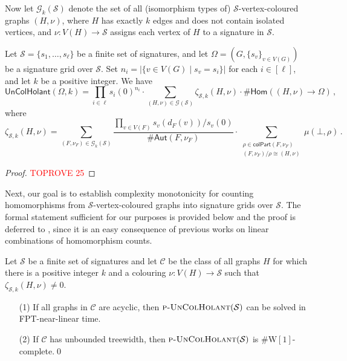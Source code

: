 \documentclass[authorcolumns,numberwithinsect]{no-lipics-v2022}
\newcommand{\homs}[2]{\mathsf{Hom}(#1 \to #2)}
\newcommand{\W}{\mathrm{W}}
\begin{document}
Now let $\mathcal{G}_k(\mathcal{S})$ denote the set of all (isomorphism types of) $\mathcal{S}$-vertex-coloured graphs $(H,\nu)$, where $H$ has exactly $k$ edges and does not contain isolated vertices, and $\nu:V(H)\to \mathcal{S}$ assigns each vertex of $H$ to a signature in $\mathcal{S}$.
\begin{lemma}\label{lem:uncoloured_hombasis_general}
    Let $\mathcal{S}=\{s_1,\dots,s_\ell\}$ be a finite set of signatures, and let
    $\Omega=(G,\{s_v\}_{v\in V(G)})$ be a signature grid over $\mathcal{S}$. Set $n_i=|\{v\in V(G)\mid s_v=s_i\}|$ for each $i\in [\ell]$, and let $k$ be a positive integer. We have
    \[ \mathsf{UnColHolant}(\Omega,k) = \prod_{i\in \ell}s_i(0)^{n_i} \cdot \sum_{(H,\nu)\in \mathcal{G}(\mathcal{S})} \zeta_{\mathcal{S},k}(H,\nu) \cdot \#\homs{(H,\nu)}{\Omega}\,, \]
    where 
    \[\zeta_{\mathcal{S},k}(H,\nu)= \sum_{(F,\nu_F)\in\mathcal{G}_k(\mathcal{S})} \frac{\prod_{v\in V(F)}{s_v(d_F(v))}/{s_v(0)}}{\#\mathsf{Aut}(F,\nu_F)} \cdot \sum_{\substack{\rho \in \mathsf{colPart}(F,\nu_F)\\(F,\nu_F)/\rho \cong (H,\nu)}}\mu(\bot,\rho)  \,.\]
\end{lemma}
\begin{proof}\textcolor{red}{TOPROVE 25}\end{proof}

Next, our goal is to establish complexity monotonicity for counting homomorphisms from $\mathcal{S}$-vertex-coloured graphs into signature grids over $\mathcal{S}$. The formal statement sufficient for our purposes is provided below and the proof is deferred to , since it is an easy consequence of previous works on linear combinations of homomorphism counts.

\begin{lemma}\label{lem:monotonicity_S-coloured}
    Let $\mathcal{S}$ be a finite set of signatures and let $\mathcal{C}$ be the class of all graphs $H$ for which there is a positive integer $k$ and a colouring $\nu:V(H)\to \mathcal{S}$ such that $\zeta_{\mathcal{S},k}(H,\nu)\neq 0$.
    \begin{itemize}
        \item[(1)] If all graphs in $\mathcal{C}$ are acyclic, then  $\text{\sc{p-UnColHolant}}(\mathcal{S})$ can be solved in FPT-near-linear time.
        \item[(2)] If $\mathcal{C}$ has unbounded treewidth, then $\text{\sc{p-UnColHolant}}(\mathcal{S})$ is $\#\W[1]$-complete.\qed
    \end{itemize}
\end{lemma}
\end{document}
